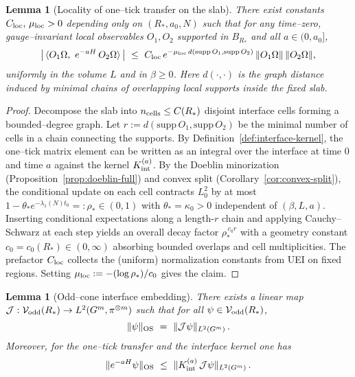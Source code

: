 \documentclass[11pt]{amsart}
\theoremstyle{plain}
\newtheorem{lemma}[theorem]{Lemma}
\theoremstyle{definition}
\theoremstyle{remark}
\begin{document}
\begin{lemma}[Locality of one--tick transfer on the slab]\label{lem:locality-one-tick}
There exist constants $C_{\rm loc},\,\mu_{\rm loc}>0$ depending only on $(R_*,a_0,N)$ such that for any time--zero, gauge--invariant local observables $O_1,O_2$ supported in $B_{R_*}$ and all $a\in(0,a_0]$,
\[
  \big|\,\langle O_1\Omega,\ e^{-aH}\,O_2\Omega\rangle\,\big|\ \le\ C_{\rm loc}\,e^{-\mu_{\rm loc}\, d(\mathrm{supp}\,O_1,\mathrm{supp}\,O_2)}\,\|O_1\Omega\|\,\|O_2\Omega\|,
\]
uniformly in the volume $L$ and in $\beta\ge 0$. Here $d(\cdot,\cdot)$ is the graph distance induced by minimal chains of overlapping local supports inside the fixed slab.
\end{lemma}

\begin{proof}
Decompose the slab into $n_{\rm cells}\le C(R_*)$ disjoint interface cells forming a bounded--degree graph. Let $r:=d(\mathrm{supp}\,O_1,\mathrm{supp}\,O_2)$ be the minimal number of cells in a chain connecting the supports. By Definition~\ref{def:interface-kernel}, the one--tick matrix element can be written as an integral over the interface at time $0$ and time $a$ against the kernel $K_{\rm int}^{(a)}$. By the Doeblin minorization (Proposition~\ref{prop:doeblin-full}) and convex split (Corollary~\ref{cor:convex-split}), the conditional update on each cell contracts $L^2_0$ by at most $1-\theta_* e^{-\lambda_1(N) t_0}=:\rho_*\in(0,1)$ with $\theta_*=\kappa_0>0$ independent of $(\beta,L,a)$. Inserting conditional expectations along a length-$r$ chain and applying Cauchy--Schwarz at each step yields an overall decay factor $\rho_*^{\,c_0 r}$ with a geometry constant $c_0=c_0(R_*)\in(0,\infty)$ absorbing bounded overlaps and cell multiplicities. The prefactor $C_{\rm loc}$ collects the (uniform) normalization constants from UEI on fixed regions. Setting $\mu_{\rm loc}:=-(\log \rho_*)/c_0$ gives the claim.
\end{proof}

\begin{lemma}[Odd--cone interface embedding]\label{lem:odd-cone-embedding}
There exists a linear map $\mathcal J: \mathcal V_{\rm odd}(R_*)\to L^2(G^m,\pi^{\otimes m})$ such that for all $\psi\in \mathcal V_{\rm odd}(R_*)$,
\[
  \|\psi\|_{\rm OS}\ =\ \|\mathcal J \psi\|_{L^2(G^m)}\,.
\]
Moreover, for the one--tick transfer and the interface kernel one has
\[
  \|e^{-aH}\psi\|_{\rm OS}\ \le\ \|K_{\rm int}^{(a)}\, \mathcal J\psi\|_{L^2(G^m)}\,.
\]
\end{lemma}
\end{document}
